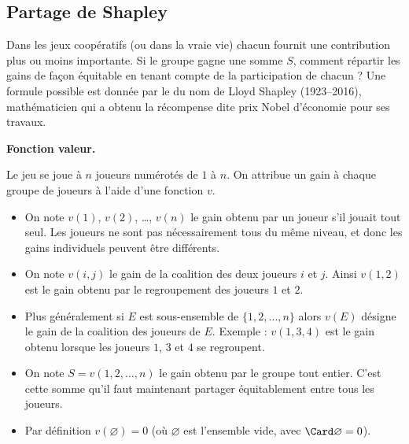 \documentclass[11pt,class=report,crop=false]{standalone}
\begin{document}
\subsection{Partage de Shapley}


Dans les jeux coopératifs (ou dans la vraie vie) chacun fournit une contribution plus ou moins importante. Si le groupe gagne une somme $S$, comment répartir les gains de façon équitable en tenant compte de la participation de chacun ? 
Une formule possible est donnée par le  du nom de Lloyd Shapley (1923--2016), mathématicien qui a obtenu la récompense dite \og{}prix Nobel d'économie\fg{} pour ses travaux.

\bigskip

\textbf{Fonction valeur.}

Le jeu se joue à $n$ joueurs numérotés de $1$ à $n$. On attribue un gain à chaque groupe de joueurs à l'aide d'une fonction $v$.

\begin{itemize}
	\item On note $v(1)$, $v(2)$, \ldots, $v(n)$ le gain obtenu par un joueur s'il jouait tout seul. Les joueurs ne sont pas nécessairement tous du même niveau, et donc les gains individuels peuvent être différents.
	
	\item On note  $v(i,j)$ le gain de la coalition des deux joueurs $i$ et $j$.
	 Ainsi $v(1,2)$ est le gain obtenu par le regroupement des joueurs $1$ et $2$.
	 
	\item Plus généralement si $E$ est sous-ensemble de $\{1,2,\ldots,n\}$ alors $v(E)$ désigne le gain de la coalition des joueurs de $E$. Exemple : $v(1,3,4)$ est le gain obtenu lorsque les joueurs $1$, $3$ et $4$ se regroupent.
	
	\item On note $S= v(1,2,\ldots,n)$ le gain obtenu par le groupe tout entier. C'est cette somme qu'il faut maintenant partager équitablement entre tous les joueurs.
	
	\item Par définition $v(\varnothing)=0$ (où $\varnothing$ est l'ensemble vide, avec $\Card \varnothing = 0$).
		
\end{itemize}

\bigskip
\end{document}
